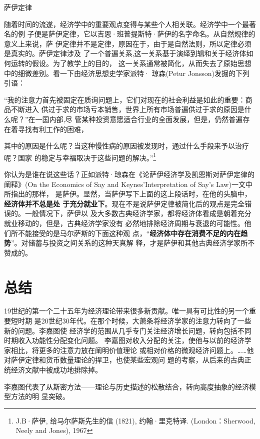 \begin{mybox}{萨伊定律}
  \begin{multicols}{2}

  随着时间的流遂，经济学中的重要观点变得与某些个人相关联。经济学中一个最著名的例
  子便是萨伊定律，它以吉恩·班普提斯特·萨伊的名字命名。从自然规律的意义上来说，萨
  伊定律并不是定律，原因在于，由于是自然法则，所以定律必须是真实的。萨伊定律涉及
  了一个普遍关系,这一关系基于演绎到辑和关于经济体如何运转的假设。为了教学上的目的，
  这一关系通常被简化，从而失去了原始思想中的细微差别。看一下由经济思想史学家派特·
  琼森(Petur Jonsson)发掘的下列引语：

  “我的注意力首先被固定在质询问题上，它们对现在的社会利益是如此的重要：商品不断进入
  供过于求的市场亏本销售，世界上所有市场普遍供过于求的原因是什么呢？”在一国内部,尽
  管某种投资意愿适合行业的全面发展，但是，仍然普遍存在着寻找有利工作的困难，

  其中的原因是什么呢？当这种慢性病的原因被发现时，通过什么手段来予以治疗呢？国家
  的稳定与幸福取决于这些问题的解决。”\footnote{J.B·萨伊, 给马尔萨斯先生的信
    (1821), 约翰·里克特译. (London：Sherwood, Neely and Jones), 1967}

你认为是谁在说这些话？正如派特·琼森在《论萨伊经济学及凯恩斯对萨伊定律的阐释》(On
the Economics of Say and Keynes’Interpretation of Say’s Law)一文中所指出的那样，
是萨伊。显然，当萨伊写下上面的这上段话时，在他的头脑中，\textbf{经济体并不总是处
  于充分就业下}。现在不是说萨伊定律被简化后的观点是完全错误的。一般情况下，萨伊以
及大多数古典经济学家，都将经济体看成是朝着充分就业移动的，但是，古典经济学家没有
必然地排除经济周期与衰退的可能性。他们所不能接受的是马尔萨斯的下面这种观
点，“\textbf{经济体中存在消费不足的内在趋势}”。对储蓄与投资之间关系的这种天真解
释，才是萨伊和其他古典经济学家所不赞成的。
  \end{multicols}
\end{mybox}

\section{总结}

19世纪的第一个二十五年为经济理论带来很多新贡献。唯一具有可比性的另一个重要短时期
是20世纪30年代。在那个时候，大萧条将经济学家的注意力转向了一些新的问题。李嘉图使
经济学的范围从几乎专门关注经济增长问题，转向包括不同时期收入功能性分配变化问题。
李嘉图对收入分配的关注，使他与以前的经济学家相比，将更多的注意力放在阐明价值理论
或相对价格的微观经济问题上。……他对萨伊定律和货币数量理论的捍卫，也使某些宏观问
题的考察，从后来的古典正统经济文献中被成功地排除掉。

李嘉图代表了从斯密方法——理论与历史描述的松散结合，转向高度抽象的经济模型方法的明
显突破。


